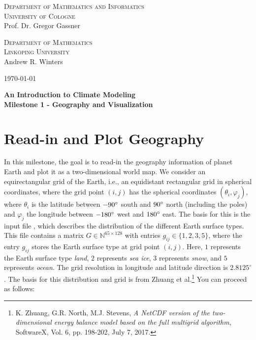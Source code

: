 \documentclass[10pt]{scrartcl}
\begin{document}
\begin{minipage}{.5\textwidth}
{\scshape Department of Mathematics and Informatics \\
University of Cologne\\}
\small Prof. Dr. Gregor Gassner \\
\end{minipage}
\begin{minipage}{.3\textwidth}
{\scshape Department of Mathematics \\
Link\"{o}ping University\\}
\small Andrew R. Winters \\
\end{minipage}
\hfill
\begin{minipage}{.15\textwidth}
\begin{flushright}
\today
\end{flushright}
\end{minipage}

\begin{center}
{\Large\bfseries
An Introduction to Climate Modeling}\\
\vspace{0.2cm}
{\bfseries Milestone 1 - Geography and Visualization}
\end{center}

\section{Read-in and Plot Geography}

In this milestone, the goal is to read-in the geography information of planet Earth and plot it as a two-dimensional world map.
We consider an equirectangular grid of the Earth, i.e., an equidistant rectangular grid in spherical coordinates, where the grid point $(i, j)$ has the spherical coordinates $(\theta_i, \varphi_j)$, where $\theta_i$ is the latitude between $-90\degree$ south and $90\degree$ north (including the poles) and $\varphi_j$ the longitude between $-180\degree$ west and $180\degree$ east.
The basis for this is the input file
\small\texttt{}\normalsize, which describes the distribution of the different Earth surface types.
This file contains a matrix $G \in \mathbb{N}^{65 \times 128}$ with entries $g_{ij} \in \{1,2,3,5\}$, where the entry $g_{ij}$ stores the Earth surface type at grid point $(i, j)$.
Here, $1$ represents the Earth surface type \textit{land}, $2$ represents \textit{sea ice}, $3$ represents \textit{snow}, and $5$ represents \textit{ocean}. The grid resolution in longitude and latitude direction is $2.8125^{\circ}$.
The basis for this distribution and grid is from Zhuang et al.\footnote{K. Zhuang, G.R. North, M.J. Stevens, {\em A NetCDF version of the two-dimensional energy balance model based on the full multigrid algorithm}, SoftwareX, Vol. 6, pp. 198-202, July 7, 2017.}
You can proceed as follows:
\end{document}
